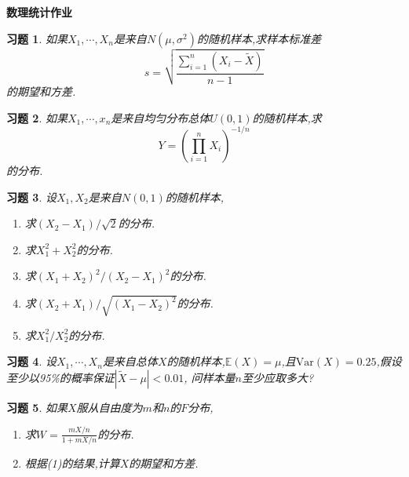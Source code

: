 \documentclass[a4paper,oneside,12pt]{ctexart}
\theoremstyle{plain}
\newtheorem{exercise}{习题}
\theoremstyle{nonumberplain}
\theoremstyle{nonumberplain}
\newcommand{\abs}[1]{\left\vert#1\right\vert}
\newcommand{\expect}{\mathbb{E}}
\newcommand{\var}{\mathrm{Var}}
\begin{document}
    \begin{center}
        \LARGE\bfseries
        数理统计作业
    \end{center}

    \begin{exercise}
        \label{ex:1}
        如果$X_1,\cdots,X_n$是来自$N(\mu,\sigma^2)$的随机样本,求样本标准差 
        \begin{equation*}
            s=\sqrt{\frac{\sum_{i=1}^n(X_i-\tilde{X})}{n-1}}
        \end{equation*}
        的期望和方差.
    \end{exercise}

    \begin{exercise}
        \label{ex:2}
        如果$X_1,\cdots,x_n$是来自均匀分布总体$U(0,1)$的随机样本,求 
        \begin{equation*}
            Y=\left(\prod_{i=1}^n X_i\right)^{-1/n}
        \end{equation*}
        的分布.
    \end{exercise}

    \begin{exercise}
        \label{ex:3}
        设$X_1,X_2$是来自$N(0,1)$的随机样本,
        \begin{enumerate}[(1)]
            \item 求$(X_2-X_1)/\sqrt{2}$的分布.
            \item 求$X_1^2+X_2^2$的分布.
            \item 求$(X_1+X_2)^2/(X_2-X_1)^2$的分布.
            \item 求$(X_2+X_1)/\sqrt{(X_1-X_2)^2}$的分布.
            \item 求$X_1^2/X_2^2$的分布.
        \end{enumerate}
    \end{exercise}

    \begin{exercise}
        \label{ex:4}
        设$X_1,\cdots,X_n$是来自总体$X$的随机样本,$\expect(X)=\mu$,且$\var(X)=0.25$,假设至少以95\%的概率保证$\abs{\tilde{X}-\mu}<0.01$,
        问样本量$n$至少应取多大?
    \end{exercise}

    \begin{exercise}
        \label{ex:5}
        如果$X$服从自由度为$m$和$n$的$F$分布,
        \begin{enumerate}[(1)]
            \item 求$W=\frac{mX/n}{1+mX/n}$的分布.
            \item 根据(1)的结果,计算$X$的期望和方差.
        \end{enumerate}
    \end{exercise}
\end{document}
